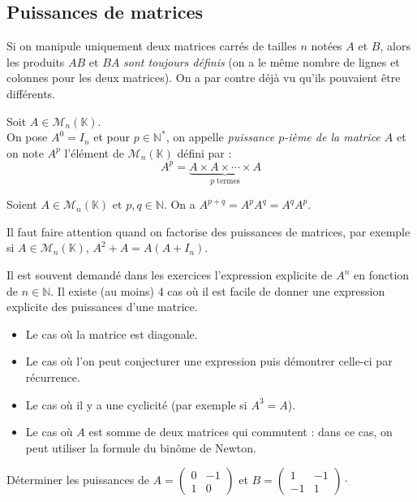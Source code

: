 \documentclass[a4paper,10pt]{report}
\begin{document}
\subsection{Puissances de matrices}
\noindent Si on manipule uniquement deux matrices carrés de tailles $n$ notées $A$ et $B$, alors les produits $AB$ et $BA$ \textit{sont toujours définis} (on a le même nombre de lignes et colonnes pour les deux matrices). On a par contre déjà vu qu'ils pouvaient être différents. 


\begin{defin}
Soit $A \in \mathcal{M}_{n}(\mathbb{K})$.\\
On pose $A^0=I_n$ et pour $p \in \mathbb{N}^*$, on appelle \textit{puissance $p$-ième de la matrice $A$} et on note $A^p$ l'élément de $\mathcal{M}_n(\mathbb{K})$ défini par :
$$A^p= \underbrace{A \times A \times \cdots \times A}_{p \text{ termes}}$$
\end{defin}

\begin{rems}
\item Soient $A \in \mathcal{M}_n(\mathbb{K})$ et $p,q \in \mathbb{N}$. On a $A^{p+q}=A^pA^q=A^qA^p.$
\item Il faut faire attention quand on factorise des puissances de matrices, par exemple si $A \in \mathcal{M}_{n}(\mathbb{K})$, \newline $A^2+A = A( A+I_n)$.
\end{rems}

\begin{metho}
Il est souvent demandé dans les exercices l'expression explicite de $A^n$ en fonction de $n \in \mathbb{N}$. Il existe (au moins) 4 cas où il est facile de donner une expression explicite des puissances d'une matrice.
\begin{itemize}
\item Le cas où la matrice est diagonale.
\item Le cas où l'on peut conjecturer une expression puis démontrer celle-ci par récurrence.
\item Le cas où il y a une cyclicité (par exemple si $A^3=A$).
\item Le cas où $A$ est somme de deux matrices qui commutent : dans ce cas, on peut utiliser la formule du binôme de Newton.
\end{itemize}
\end{metho}

\begin{exa} Déterminer les puissances de $A = \begin{pmatrix}0&-1\\1&0\end{pmatrix}$ et $B=\begin{pmatrix} 1&-1\\-1&1\end{pmatrix}\cdot$
\end{exa}
\end{document}
